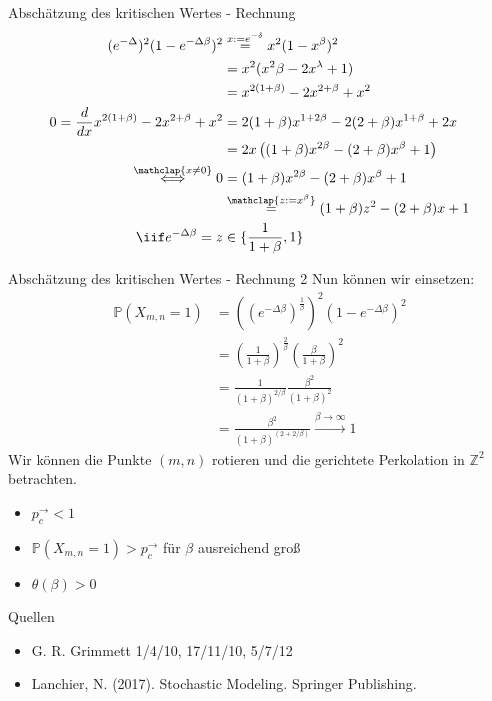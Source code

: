 \documentclass[11pt]{beamer}
\begin{document}
\begin{frame}{Absch\"atzung des kritischen Wertes - Rechnung}
    \begin{align*}
        (e^{-\Delta})^2(1 - e^{-\Delta\beta})^2 &\overset{x := e^{-\delta}}{=} 
            x^2(1 - x^\beta)^2 \\
            &= x^2(x^2\beta - 2 x^\lambda + 1) \\
            &= x^{2(1 + \beta)} - 2x^{2 + \beta} + x^2 \\
            0 = \frac{d}{dx} x^{2(1 + \beta)} - 2x^{2 + \beta} + x^2 
            &= 2(1 + \beta) x^{1 + 2\beta} - 2(2 + \beta)x^{1 + \beta} + 2x \\
            &= 2x\left( (1 + \beta)x^{2\beta} - (2 + \beta)x^\beta + 1 \right) \\
       \overset{\mathclap{x \not= 0}}{\iff } 0 &= ( 1 + \beta) x^{2\beta} - ( 2 + \beta)x^\beta + 1 \\
            &\overset{\mathclap{z:= x^\beta}}{=} (1 + \beta) z^2 - (2 + \beta)x + 1\\
            \iif e^{-\Delta\beta} = z &\in \{ \frac{1}{1 + \beta}, 1 \}
    \end{align*}
\end{frame}

\begin{frame}{Absch\"atzung des kritischen Wertes - Rechnung 2}
    Nun können wir einsetzen:
    \begin{align*}
        \mathbb{P}(X_{m, n} = 1) &= ((e^{-\Delta\beta})^{\frac{1}{\beta}})^2(1 - e^{-\Delta\beta})^2 \\
                                 &= \left(\frac{1}{1 + \beta}\right)^\frac{2}{\beta}\left(\frac{\beta}{1 + \beta}\right)^2 \\
                                 &= \frac{1}{(1 + \beta)^{2/\beta}}\frac{\beta^2}{(1 + \beta)^2} \\
                                 &= \frac{\beta^2}{(1 + \beta)^{(2 + 2/\beta)}} \overset{\beta \to \infty}{\to} 1
    \end{align*}
    Wir können die Punkte $(m, n)$ rotieren und die gerichtete Perkolation in $\mathbb{Z}^2$ betrachten. 
    \begin{itemize}
        \item $p_c^\to < 1$ 
        \item $\mathbb{P}(X_{m, n} = 1) > p_c^\to$ f\"ur $\beta$ ausreichend groß
        \item $\theta(\beta) > 0$
    \end{itemize}
\end{frame}

\begin{frame}{Quellen}
    \begin{itemize}
        \item G. R. Grimmett 1/4/10, 17/11/10, 5/7/12
        \item Lanchier, N. (2017). Stochastic Modeling. Springer Publishing.
    \end{itemize}
\end{frame}
\end{document}

